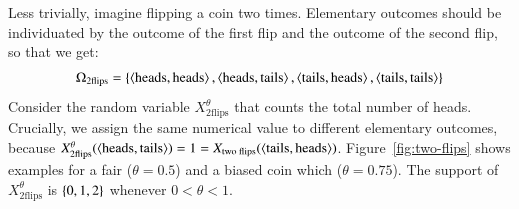 \documentclass[nobib,nofonts]{tufte-handout}
\begin{document}
\begin{example}
  Less trivially, imagine flipping a coin two times. Elementary outcomes should be individuated by the outcome of the first flip and the outcome of the second flip, so that we get:
  \begin{align*}
    \Omega_{\text{2flips}} = \left\{\left \langle \text{heads}, \text{heads}\right\rangle, \left \langle \text{heads}, \text{tails}\right\rangle,
    \left \langle \text{tails}, \text{heads}\right\rangle, \left \langle \text{tails}, \text{tails}\right\rangle\right\}
  \end{align*}
  Consider the random variable $X_{\text{2flips}}^{\theta}$ that counts the total number of heads.
  Crucially, we assign the same numerical value to different elementary outcomes, because $X_{\text{2flips}}^{\theta}(\left \langle \text{heads}, \text{tails}\right\rangle) = 1 = X_{\text{two       flips}}(\left \langle \text{tails}, \text{heads}\right\rangle)$.
  Figure~\ref{fig:two-flips} shows examples for a fair ($\theta = 0.5$) and a biased coin which ($\theta=0.75$).
  The support of $X_{\text{2flips}}^{\theta}$ is $\left\{0,1,2\right\}$ whenever $0 < \theta < 1$.

  \begin{figure}
  \centering
  \twoFlips

  \hfill


\end{figure}
\end{example}
\end{document}

